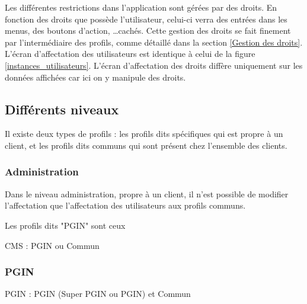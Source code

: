 Les différentes restrictions dans l'application sont gérées par des droits.
En fonction des droits que possède l'utilisateur, celui-ci verra des entrées dans les menus, des boutons d'action, \ldots cachés.
Cette gestion des droits se fait finement par l'intermédiaire des profils, comme détaillé dans la section \ref{Gestion des droits}.
\\

L'écran d'affectation des utilisateurs est identique à celui de la figure \ref{instances_utilisateurs}.
L'écran d'affectation des droits diffère uniquement sur les données affichées car ici on y manipule des droits.


\subsection{Différents niveaux}

Il existe deux types de profils : les profils dits spécifiques qui est propre à un client, et les profils dits communs qui sont présent chez l'ensemble des clients.


\subsubsection{Administration}

Dans le niveau administration, propre à un client, il n'est possible de modifier l'affectation  que l'affectation des utilisateurs aux profils communs.
 

Les profils dits "PGIN" sont ceux

CMS : PGIN ou Commun


\subsubsection{PGIN}

PGIN : PGIN (Super PGIN ou PGIN) et Commun